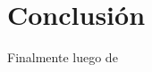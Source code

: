 \documentclass[10pt,a4paper]{article} %
\begin{document}
                                                                                                                                                                                                                                                                                                                                                                                                                                                                                                                                                                                                                                                                                                                                                                                        \section{Conclusi\'on}
                                                                                                                                                                                                                                                                                                                                                                                                                                                                                                                                                                                                                                                                                                                                                                                            Finalmente
                                                                                                                                                                                                                                                                                                                                                                                                                                                                                                                                                                                                                                                                                                                                                                                            luego
                                                                                                                                                                                                                                                                                                                                                                                                                                                                                                                                                                                                                                                                                                                                                                                            de
\end{document}
